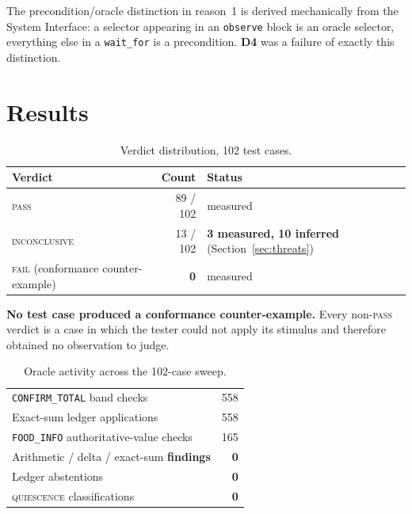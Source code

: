 \documentclass[11pt,a4paper]{article}
\newcommand{\gate}[1]{\texttt{\small #1}}
\newcommand{\dref}[1]{\textbf{D#1}}
\begin{document}
\noindent The precondition/oracle distinction in reason~1 is derived
mechanically from the System Interface: a selector appearing in an
\texttt{observe} block is an oracle selector, everything else in a
\texttt{wait\_for} is a precondition. \dref{4} was a failure of exactly this
distinction.

\section{Results}
\label{sec:results}

\begin{table}[h]
\centering\footnotesize
\caption{Verdict distribution, 102 test cases.}
\label{tab:verdicts}
\begin{tabular}{@{}lrl@{}}
\toprule
\textbf{Verdict} & \textbf{Count} & \textbf{Status} \\
\midrule
\textsc{pass} & 89 / 102 & measured \\
\textsc{inconclusive} & 13 / 102 & \textbf{3 measured, 10 inferred}
(Section~\ref{sec:threats}) \\
\textsc{fail} (conformance counter-example) & \textbf{0} & measured \\
\bottomrule
\end{tabular}
\end{table}

\noindent\textbf{No test case produced a conformance counter-example.} Every
non-\textsc{pass} verdict is a case in which the tester could not apply its
stimulus and therefore obtained no observation to judge.

\begin{table}[h]
\centering\footnotesize
\caption{Oracle activity across the 102-case sweep.}
\label{tab:activity}
\begin{tabular}{@{}lr@{}}
\toprule
\gate{CONFIRM\_TOTAL} band checks & 558 \\
Exact-sum ledger applications & 558 \\
\gate{FOOD\_INFO} authoritative-value checks & 165 \\
\midrule
Arithmetic / delta / exact-sum \textbf{findings} & \textbf{0} \\
Ledger abstentions & \textbf{0} \\
\textsc{quiescence} classifications & \textbf{0} \\
\bottomrule
\end{tabular}
\end{table}
\end{document}
